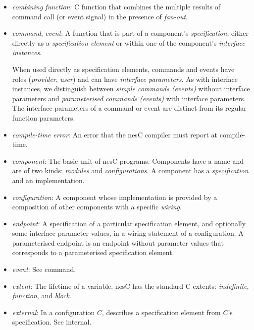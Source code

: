 \documentclass[11pt,letterpaper]{article}
\newcommand{\nesc}{nesC\xspace}
\begin{document}
\begin{itemize}

\item \emph{combining function}: C function that combines the multiple
results of command call (or event signal) in the presence of
\emph{fan-out}.

\item \emph{command}, \emph{event}: A function that is part of a
component's \emph{specification}, either directly as a \emph{specification
element} or within one of the component's \emph{interface instances}.

When used directly as specification elements, commands and events have
roles (\emph{provider}, \emph{user}) and can have \emph{interface
parameters}. As with interface instances, we distinguish between
\emph{simple commands (events)} without interface parameters and
\emph{parameterised commands (events)} with interface parameters. The
interface parameters of a command or event are distinct from its regular
function parameters.

\item \emph{compile-time error}: An error that the \nesc compiler must
report at compile-time.

\item \emph{component}: The basic unit of \nesc programs. Components have a
name and are of two kinds: \emph{modules} and \emph{configurations}. A
component has a \emph{specification} and an implementation. 

\item \emph{configuration}: A component whose implementation is provided
by a composition of other components with a specific \emph{wiring}.

\item \emph{endpoint}: A specification of a particular specification
element, and optionally some interface parameter values, in a wiring
statement of a configuration. A parameterised endpoint is an endpoint
without parameter values that corresponds to a parameterised specification
element.

\item \emph{event}: See command.

\item \emph{extent}: The lifetime of a variable. \nesc has the standard C
extents: \emph{indefinite}, \emph{function}, and \emph{block}.

\item \emph{external}: In a configuration $C$, describes a specification
element from $C$'s specification. See internal.


\end{itemize}
\end{document}
